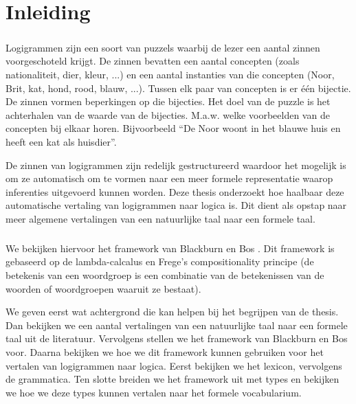 \chapter{Inleiding}
\paragraph{} Logigrammen zijn een soort van puzzels waarbij de lezer een aantal zinnen voorgeschoteld krijgt. De zinnen bevatten een aantal concepten (zoals nationaliteit, dier, kleur, ...) en een aantal instanties van die concepten (Noor, Brit, kat, hond, rood, blauw, ...). Tussen elk paar van concepten is er \'e\'en bijectie. De zinnen vormen beperkingen op die bijecties. Het doel van de puzzle is het achterhalen van de waarde van de bijecties. M.a.w. welke voorbeelden van de concepten bij elkaar horen. Bijvoorbeeld ``De Noor woont in het blauwe huis en heeft een kat als huisdier''.

De zinnen van logigrammen zijn redelijk gestructureerd waardoor het mogelijk is om ze automatisch om te vormen naar een meer formele representatie waarop inferenties uitgevoerd kunnen worden. Deze thesis onderzoekt hoe haalbaar deze automatische vertaling van logigrammen naar logica is. Dit dient als opstap naar meer algemene vertalingen van een natuurlijke taal naar een formele taal.

\paragraph{} We bekijken hiervoor het framework van Blackburn en Bos \cite{Blackburn2005, Blackburn2006}. Dit framework is gebaseerd op de lambda-calcalus en Frege's compositionality principe (de betekenis van een woordgroep is een combinatie van de betekenissen van de woorden of woordgroepen waaruit ze bestaat).

We geven eerst wat achtergrond die kan helpen bij het begrijpen van de thesis. Dan bekijken we een aantal vertalingen van een natuurlijke taal naar een formele taal uit de literatuur. Vervolgens stellen we het framework van Blackburn en Bos voor. Daarna bekijken we hoe we dit framework kunnen gebruiken voor het vertalen van logigrammen naar logica. Eerst bekijken we het lexicon, vervolgens de grammatica. Ten slotte breiden we het framework uit met types en bekijken we hoe we deze types kunnen vertalen naar het formele vocabularium.
